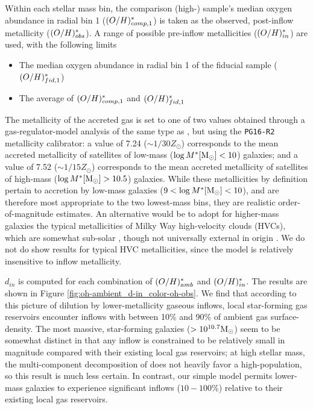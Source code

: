 Within each stellar mass bin, the comparison (high-\metdisp) sample's median oxygen abundance in radial bin 1 ($(O/H)^*_{comp,1}$) is taken as the observed, post-inflow metallicity ($(O/H)^*_{obs}$). A range of possible pre-inflow metallicities ($(O/H)^*_{in}$) are used, with the following limits
%
\begin{itemize}
    \item The median oxygen abundance in radial bin 1 of the fiducial sample ($(O/H)^*_{fid,1}$)
    \item The average of $(O/H)^*_{comp,1}$ and $(O/H)^*_{fid,1}$
\end{itemize}
%

The metallicity of the accreted gas is set to one of two values obtained through a gas-regulator-model analysis of the same type as \citet{schaefer_19_accretion}, but using the \texttt{PG16-R2} metallicity calibrator: a value of 7.24 ($\sim 1/30 Z_{\odot}$) corresponds to the mean accreted metallicity of satellites of low-mass ($\log M^* {\rm [M_{\odot}]} < 10$) galaxies; and a value of 7.52 ($\sim 1/15 Z_{\odot}$) corresponds to the mean accreted metallicity of satellites of high-mass ($\log M^* {\rm [M_{\odot}]} > 10.5$) galaxies. While these metallicities by definition pertain to accretion by low-mass galaxies ($9 < \log M^* {\rm [M_{\odot}]} < 10$), and are therefore most appropriate to the two lowest-mass bins, they are realistic order-of-magnitude estimates. An alternative would be to adopt for higher-mass galaxies the typical metallicities of Milky Way high-velocity clouds (HVCs), which are somewhat sub-solar \citep{wakker_2004_hvc_bookchapter}, though not universally external in origin \citep{fox_2016_smithcloud}. We do not do show results for typical HVC metallicities, since the model is relatively insensitive to inflow metallicity.

$d_{in}$ is computed for each combination of $(O/H)^*_{amb}$ and $(O/H)^*_{in}$. The results are shown in Figure \ref{fig:oh-ambient_d-in_color-oh-obs}. We find that according to this picture of dilution by lower-metallicity gaseous inflows, local star-forming gas reservoirs encounter inflows with between 10\% and 90\% of ambient gas surface-density. The most massive, star-forming galaxies ($> 10^{10.7} {\rm M_{\odot}}$) seem to be somewhat distinct in that any inflow is constrained to be relatively small in magnitude compared with their existing local gas reservoirs; at high stellar mass, the multi-component decomposition of \metdisp does not heavily favor a high-\metdisp population, so this result is much less certain. In contrast, our simple model permits lower-mass galaxies to experience significant inflows ($10-100\%$) relative to their existing local gas reservoirs.

